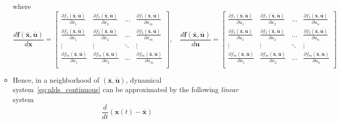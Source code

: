 \documentclass[12pt,a4paper]{article}
\begin{document}
\begin{itemize}
\begin{itemize}
    where
    \begin{equation}\nonumber%
      \frac{d\bm{f}(\bar{\bm{x}},\bar{\bm{u}})}{d\bm{x}}
      =
      \begin{bmatrix}
        \frac{\partial f_{1}(\bar{\bm{x}},\bar{\bm{u}})}{\partial x_{1}} & \frac{\partial f_{1}(\bar{\bm{x}},\bar{\bm{u}})}{\partial x_{2}}  & \ldots & \frac{\partial f_{1}(\bar{\bm{x}},\bar{\bm{u}})}{\partial x_{m}} \\
        \frac{\partial f_{2}(\bar{\bm{x}},\bar{\bm{u}})}{\partial x_{1}} & \frac{\partial f_{2}(\bar{\bm{x}},\bar{\bm{u}})}{\partial x_{2}}  & \ldots & \frac{\partial f_{2}(\bar{\bm{x}},\bar{\bm{u}})}{\partial x_{m}} \\
        \vdots & \vdots  & \ddots & \vdots \\
        \frac{\partial f_{m}(\bar{\bm{x}},\bar{\bm{u}})}{\partial x_{1}} & \frac{\partial f_{m}(\bar{\bm{x}},\bar{\bm{u}})}{\partial x_{2}}  & \ldots & \frac{\partial f_{m}(\bar{\bm{x}},\bar{\bm{u}})}{\partial x_{m}} \\
      \end{bmatrix},
      \quad
      \frac{d\bm{f}(\bar{\bm{x}},\bar{\bm{u}})}{d\bm{u}}
      =
      \begin{bmatrix}
        \frac{\partial f_{1}(\bar{\bm{x}},\bar{\bm{u}})}{\partial u_{1}} & \frac{\partial f_{1}(\bar{\bm{x}},\bar{\bm{u}})}{\partial x_{2}}  & \ldots & \frac{\partial f_{1}(\bar{\bm{x}},\bar{\bm{u}})}{\partial u_{n}} \\
        \frac{\partial f_{2}(\bar{\bm{x}},\bar{\bm{u}})}{\partial u_{1}} & \frac{\partial f_{2}(\bar{\bm{x}},\bar{\bm{u}})}{\partial x_{2}}  & \ldots & \frac{\partial f_{2}(\bar{\bm{x}},\bar{\bm{u}})}{\partial u_{n}} \\
        \vdots & \vdots  & \ddots & \vdots \\
        \frac{\partial f_{m}(\bar{\bm{x}},\bar{\bm{u}})}{\partial u_{1}} & \frac{\partial f_{m}(\bar{\bm{x}},\bar{\bm{u}})}{\partial x_{2}}  & \ldots & \frac{\partial f_{m}(\bar{\bm{x}},\bar{\bm{u}})}{\partial u_{n}} \\
      \end{bmatrix}
    \end{equation}
  \item Hence, in a neighborhood of $(\bar{\bm{x}},\bar{\bm{u}})$,
    dynamical system~\eqref{eq:nlds_continuous} can be approximated by the following \emph{linear} system
    \begin{equation}\nonumber%
      \frac{d}{dt}\left(\bm{x}(t)-\bar{\bm{x}}\right)

\end{equation}
\end{itemize}
\end{itemize}
\end{document}
